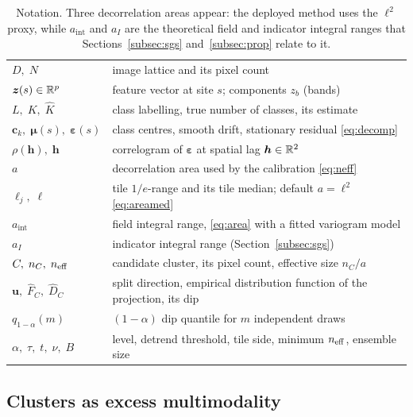 \begin{table}[t]
\centering
%
\caption{Notation. Three decorrelation areas appear: the deployed method uses
the $\ell^2$ proxy, while $a_{\mathrm{int}}$ and $a_I$ are the theoretical
field and indicator integral ranges that Sections~\ref{subsec:sgs}
and~\ref{subsec:prop} relate to it.}\label{tab:notation}
\small
\begin{tabular}{ll}
\toprule
$D,\;N$ & image lattice and its pixel count\\
$\bm z(s)\in\mathbb{R}^p$ & feature vector at site $s$; components $z_b$ (bands)\\
$L,\;K,\;\hat K$ & class labelling, true number of classes, its estimate\\
$\bm c_k,\;\bm\mu(s),\;\bm\varepsilon(s)$ & class centres, smooth drift,
  stationary residual \eqref{eq:decomp}\\
$\rho(\bm h),\;\bm h$ & correlogram of $\bm\varepsilon$ at spatial lag
  $\bm h\in\mathbb{R}^2$\\
$a$ & decorrelation area used by the calibration \eqref{eq:neff}\\
$\ell_j,\;\ell$ & tile $1/e$-range and its tile median; default $a=\ell^2$
  \eqref{eq:areamed}\\
$a_{\mathrm{int}}$ & field integral range, \eqref{eq:area} with a fitted
  variogram model\\
$a_I$ & indicator integral range (Section~\ref{subsec:sgs})\\
$C,\;n_C,\;n_{\mathrm{eff}}$ & candidate cluster, its pixel count, effective size
  $n_C/a$\\
$\bm u,\;\hat F_C,\;\hat D_C$ & split direction, empirical distribution
  function of the projection, its dip\\
$q_{1-\alpha}(m)$ & $(1-\alpha)$ dip quantile for $m$ independent draws\\
$\alpha,\;\tau,\;t,\;\nu,\;B$ & level, detrend threshold, tile side, minimum
  $n_{\mathrm{eff}}$, ensemble size\\
\bottomrule
\end{tabular}
\end{table}

\subsection{Clusters as excess multimodality}\label{subsec:null}

